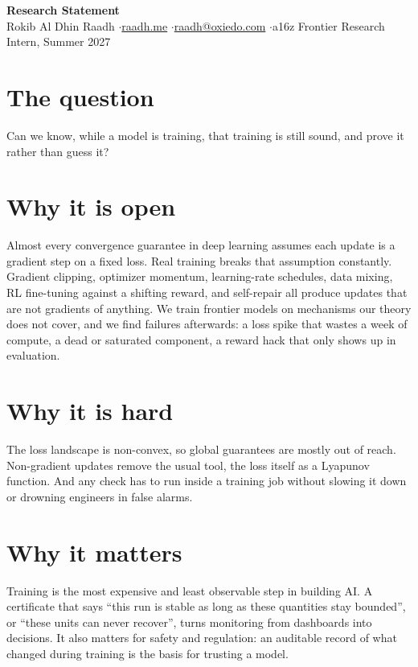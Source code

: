 \documentclass[10pt,a4paper]{article}
\begin{document}
\RaggedRight
\color{body}
\begin{center}
  {\Large\bfseries\color{heading} Research Statement}\\[2pt]
  {\small Rokib Al Dhin Raadh \enspace$\cdot$\enspace \href{https://www.raadh.me}{raadh.me} \enspace$\cdot$\enspace \href{mailto:raadh@oxiedo.com}{raadh@oxiedo.com} \enspace$\cdot$\enspace a16z Frontier Research Intern, Summer 2027}
\end{center}

\section*{The question}
Can we know, while a model is training, that training is still sound, and prove it rather than guess it?

\section*{Why it is open}
Almost every convergence guarantee in deep learning assumes each update is a gradient step on a fixed loss. Real training breaks that assumption constantly. Gradient clipping, optimizer momentum, learning-rate schedules, data mixing, RL fine-tuning against a shifting reward, and self-repair all produce updates that are not gradients of anything. We train frontier models on mechanisms our theory does not cover, and we find failures afterwards: a loss spike that wastes a week of compute, a dead or saturated component, a reward hack that only shows up in evaluation.

\section*{Why it is hard}
The loss landscape is non-convex, so global guarantees are mostly out of reach. Non-gradient updates remove the usual tool, the loss itself as a Lyapunov function. And any check has to run inside a training job without slowing it down or drowning engineers in false alarms.

\section*{Why it matters}
Training is the most expensive and least observable step in building AI. A certificate that says ``this run is stable as long as these quantities stay bounded'', or ``these units can never recover'', turns monitoring from dashboards into decisions. It also matters for safety and regulation: an auditable record of what changed during training is the basis for trusting a model.
\end{document}
